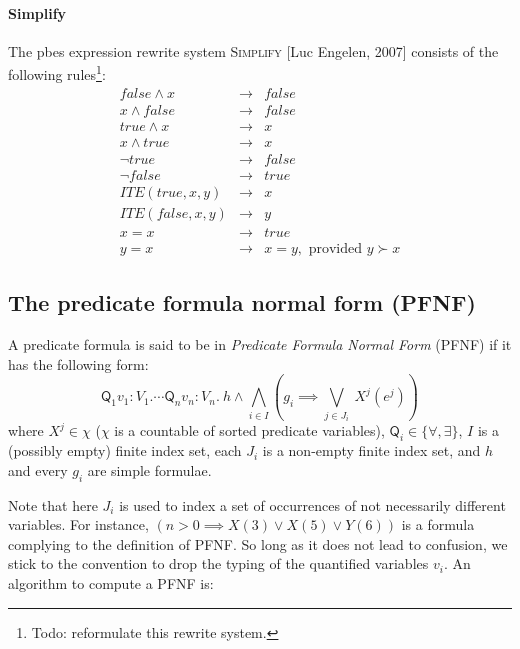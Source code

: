 \newpage
\paragraph{Simplify}

The pbes expression rewrite system \textsc{Simplify} [Luc Engelen, 2007]
consists of the following rules\footnote{%
Todo: reformulate this rewrite system.}:%
\begin{eqnarray*}
false\wedge x &\rightarrow &false \\
x\wedge false &\rightarrow &false \\
true\wedge x &\rightarrow &x \\
x\wedge true &\rightarrow &x \\
\lnot true &\rightarrow &false \\
\lnot false &\rightarrow &true \\
ITE(true,x,y) &\rightarrow &x \\
ITE(false,x,y) &\rightarrow &y \\
x=x &\rightarrow &true \\
y=x &\rightarrow &x=y,\text{ provided }y\succ x
\end{eqnarray*}

\subsection{The predicate formula normal form (PFNF)}

\begin{definition}
A predicate formula is said to be in \emph{Predicate Formula Normal Form}
(PFNF) if it has the following form:
\begin{equation*}
\mathsf{Q}_{1}v_{1}{:}V_{1}.\cdots \mathsf{Q}_{n}v_{n}{:}V_{n}.~h\wedge
\bigwedge\limits_{i\in I}\left( g_{i}\implies \bigvee\limits_{j\in
J_{i}}~X^{j}(e^{j})\right)
\end{equation*}%
where $X^{j}\in \chi $ ($\chi $ is a countable of sorted predicate
variables), $\mathsf{Q}_{i}\in \{\forall ,\exists \}$, $I$ is a (possibly
empty) finite index set, each $J_{i}$ is a non-empty finite index set, and $%
h $ and every $g_{i}$ are simple formulae.
\end{definition}

Note that here $J_{i}$ is used to index a set of occurrences of not
necessarily different variables. For instance, $(n>0\implies X(3)\vee
X(5)\vee Y(6))$ is a formula complying to the definition of PFNF. So long as
it does not lead to confusion, we stick to the convention to drop the typing
of the quantified variables $v_{i}$. An algorithm to compute a PFNF is:

